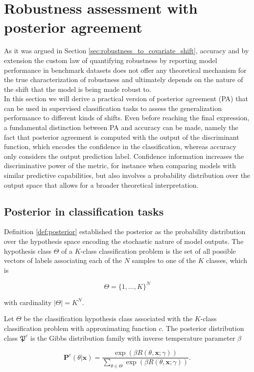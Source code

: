 \section{Robustness assessment with posterior agreement}

As it was argued in Section \ref{sec:robustness_to_covariate_shift}, accuracy and
by extension the custom law of quantifying robustness by reporting
model performance in benchmark datasets does not offer any theoretical
mechanism for the true characterization of robustness and ultimately depends 
on the nature of the shift that the model is being made robust to. \\

In this section we will derive a practical version of posterior agreement (PA) that
can be used in supervised classification tasks to assess the generalization performance
to different kinds of shifts. Even before reaching the final expression, a 
fundamental distinction between PA and accuracy can be made, namely the fact
that posterior agreement is computed with the output of the discriminant function,
which encodes the confidence in the classification, whereas accuracy only
considers the output prediction label. Confidence information increases 
the discriminative power of the metric, for instance when
comparing models with similar predictive capabilities, but also involves a probability
distribution over the output space that allows for a broader theoretical
interpretation.

\subsection{Posterior in classification tasks}

Definition \ref{def:posterior} established the posterior as the probability
distribution over the hypothesis space encoding the stochastic nature of
model outputs. The hypothesis class $\Theta$ of a $K$-class classification problem is the set of
all possible vectors of labels associating each of the $N$ samples
to one of the $K$ classes, which is

$$
\Theta = \{1, \dots, K \}^N
$$

with cardinality $|\Theta| = K^N$.

\begin{theorem}
    Let $\Theta$ be the classification hypothesis class associated with the 
    $K$-class classification problem with approximating function $c$.
    The posterior distribution class $\mathfrak{P}^c$ is the Gibbs
    distribution family with inverse temperature parameter $\beta$
    \cite{buhmannPosteriorAgreementModel2022}

    $$
        \mathbf{P}^c (\theta | \bm{x}) = \frac{\exp \left ( \beta R(\theta, \bm{x}; \gamma) \right )}{\sum_{\theta \in \Theta} \exp \left ( \beta R(\theta, \bm{x}; \gamma) \right )}.
    $$
\end{theorem}

